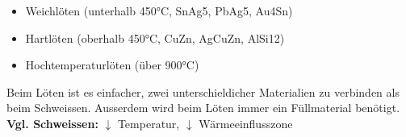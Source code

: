\begin{itemize}
    \item Weichlöten (unterhalb 450°C, SnAg5, PbAg5, Au4Sn)
    \item Hartlöten (oberhalb 450°C, CuZn, AgCuZn, AlSi12)
    \item Hochtemperaturlöten (über 900°C)
\end{itemize}
Beim Löten ist es einfacher, zwei unterschieldicher Materialien zu 
verbinden als beim Schweissen. Ausserdem wird beim Löten immer 
ein Füllmaterial benötigt.\\

\textbf{Vgl. Schweissen:} $\downarrow $ Temperatur, $\downarrow$ Wärmeeinflusszone

